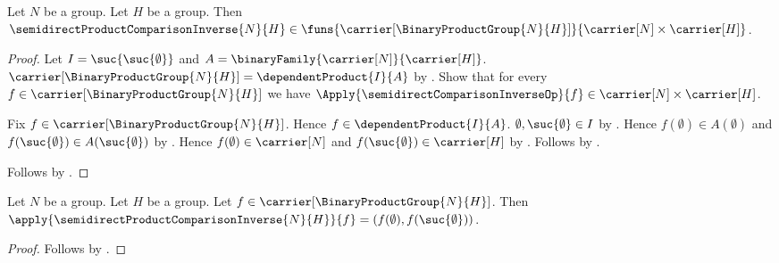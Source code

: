 \begin{proposition}\label{semidirect_product_comparison_inverse_type}
    Let $N$ be a group.
    Let $H$ be a group.
    Then $\semidirectProductComparisonInverse{N}{H}\in
        \funs{\carrier[\BinaryProductGroup{N}{H}]}
            {\carrier[N]\times\carrier[H]}$.
\end{proposition}
\begin{proof}
    Let $I=\suc{\suc{\emptyset}}$ and
        $A=\binaryFamily{\carrier[N]}{\carrier[H]}$.
    $\carrier[\BinaryProductGroup{N}{H}]=\dependentProduct{I}{A}$ by
        .
    Show that for every $f\in\carrier[\BinaryProductGroup{N}{H}]$ we have
        $\Apply{\semidirectComparisonInverseOp}{f}\in
            \carrier[N]\times\carrier[H]$.
    \begin{subproof}
        Fix $f\in\carrier[\BinaryProductGroup{N}{H}]$.
        Hence $f\in\dependentProduct{I}{A}$.
        $\emptyset,\suc{\emptyset}\in I$ by .
        Hence $f(\emptyset)\in A(\emptyset)$ and
            $f(\suc{\emptyset})\in A(\suc{\emptyset})$ by
            .
        Hence $f(\emptyset)\in\carrier[N]$ and
            $f(\suc{\emptyset})\in\carrier[H]$ by
            .
        Follows by .
    \end{subproof}
    Follows by
        .
\end{proof}

\begin{proposition}\label{semidirect_product_comparison_inverse_apply}
    Let $N$ be a group.
    Let $H$ be a group.
    Let $f\in\carrier[\BinaryProductGroup{N}{H}]$.
    Then
        $\apply{\semidirectProductComparisonInverse{N}{H}}{f}=
            (f(\emptyset),f(\suc{\emptyset}))$.
\end{proposition}
\begin{proof}
    Follows by
        .
\end{proof}


